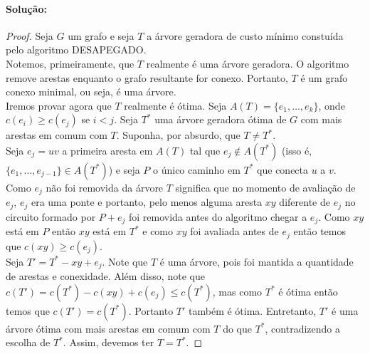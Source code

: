 \documentclass[11pt,a4paper,notitlepage]{exam}
\begin{document}
\paragraph{Solução:}
\begin{proof}
  Seja $G$ um grafo e seja $T$ a árvore geradora de custo mínimo constuída pelo algoritmo DESAPEGADO.\\
  \hphantom{xxx}Notemos, primeiramente, que $T$ realmente é uma árvore geradora. O algoritmo remove arestas enquanto o grafo resultante for conexo. Portanto, $T$ é um grafo conexo minimal, ou seja, é uma árvore.\\
  \hphantom{xxx}Iremos provar agora que $T$ realmente é ótima. Seja $A(T)=\{e_1, \dots, e_k\}$, onde $c(e_i) \geq c(e_j)$ se $i < j$. Seja $T^*$ uma árvore geradora ótima de $G$ com mais arestas em comum com $T$. Suponha, por absurdo, que $T \neq T^*$. \\
  \hphantom{xxx}Seja $e_j = uv$ a primeira aresta em $A(T)$ tal que $e_j \notin A(T^*)$ (isso é, $\{ e_1, \dots, e_{j-1}\} \in A(T^*)$) e seja $P$ o único caminho em $T^*$ que conecta $u$ a $v$. Como $e_j$ não foi removida da árvore $T$ significa que no momento de avaliação de $e_j$, $e_j$ era uma ponte e portanto, pelo menos alguma aresta $xy$ diferente de $e_j$ no circuito formado por $P+e_j$ foi removida antes do algoritmo chegar a $e_j$. Como $xy$ está em $P$ então $xy$ está em $T^*$ e como $xy$ foi avaliada antes de $e_j$ então temos que $c(xy) \geq c(e_j)$.\\
  \hphantom{xxx}Seja $T' = T^* - xy + e_j$. Note que $T$ é uma árvore, pois foi mantida a quantidade de arestas e conexidade. Além disso, note que $c(T') = c(T^*) - c(xy) + c(e_j) \leq c(T^*)$, mas como $T^*$ é ótima então temos que $c(T') = c(T^*)$. Portanto $T'$ também é ótima. Entretanto, $T'$ é uma árvore ótima com mais arestas em comum com $T$ do que $T^*$, contradizendo a escolha de $T^*$. Assim, devemos ter $T = T^*$.
\end{proof}
\end{document}

